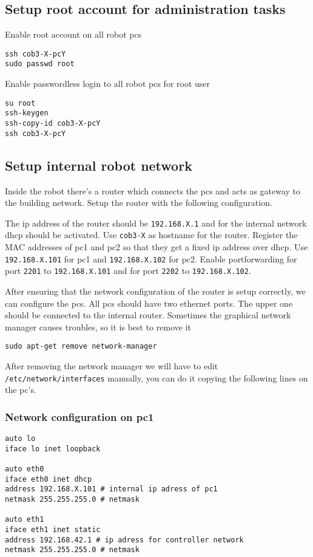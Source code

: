 \subsection{Setup root account for administration tasks} \label{sec:root_user}
Enable root account on all robot pcs
\begin{lstlisting}
ssh cob3-X-pcY
sudo passwd root
\end{lstlisting}

Enable passwordless login to all robot pcs for root user
\begin{lstlisting}
su root
ssh-keygen
ssh-copy-id cob3-X-pcY
ssh cob3-X-pcY
\end{lstlisting}

\subsection{Setup internal robot network}\label{sec:network}
Inside the robot there's a router which connects the pcs and acts as gateway to the building network. Setup the router with the following configuration. 

The ip address of the router should be \texttt{192.168.X.1} and for the internal network dhcp should be activated. Use \texttt{cob3-X} as hostname for the router. Register the MAC addresses of pc1 and pc2 so that they get a fixed ip address over dhcp. Use \texttt{192.168.X.101} for pc1 and \texttt{192.168.X.102} for pc2. Enable portforwarding for port \texttt{2201} to \texttt{192.168.X.101} and for port \texttt{2202} to \texttt{192.168.X.102}.

After ensuring that the network configuration of the router is setup correctly, we can configure the pcs. All pcs should have two ethernet ports. The upper one should be connected to the internal router. Sometimes the graphical network manager causes troubles, so it is best to remove it
\begin{lstlisting}
sudo apt-get remove network-manager
\end{lstlisting}

After removing the network manager we will have to edit \texttt{/etc/network/interfaces} manually,  you can do it copying the following lines on the pc's.

\subsubsection{Network configuration on pc1}

\begin{lstlisting}
auto lo
iface lo inet loopback

auto eth0
iface eth0 inet dhcp
address 192.168.X.101 # internal ip adress of pc1
netmask 255.255.255.0 # netmask

auto eth1
iface eth1 inet static
address 192.168.42.1 # ip adress for controller network
netmask 255.255.255.0 # netmask
\end{lstlisting}


